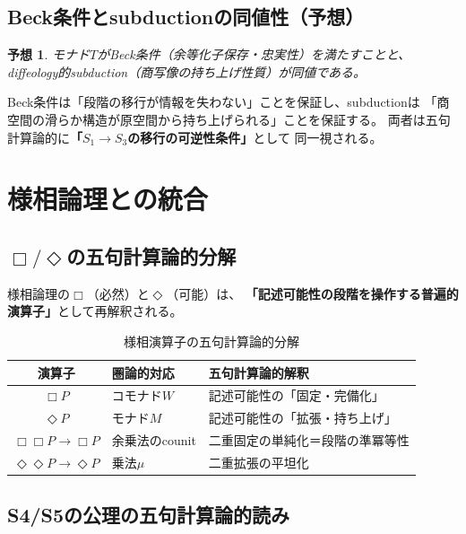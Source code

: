 \documentclass[11pt,a4paper]{ltjsarticle}
\newtheorem{conjecture}[definition]{予想}
\theoremstyle{remark}
\begin{document}
\subsection{Beck条件とsubductionの同値性（予想）}

\begin{conjecture}
モナド$T$がBeck条件（余等化子保存・忠実性）を満たすことと、
diffeology的subduction（商写像の持ち上げ性質）が同値である。
\end{conjecture}

Beck条件は「段階の移行が情報を失わない」ことを保証し、subductionは
「商空間の滑らか構造が原空間から持ち上げられる」ことを保証する。
両者は五句計算論的に\textbf{「$S_1\to S_3$の移行の可逆性条件」}として
同一視される。

\section{様相論理との統合}

\subsection{\texorpdfstring{$\Box/\Diamond$}{必然・可能演算子}の五句計算論的分解}

様相論理の$\Box$（必然）と$\Diamond$（可能）は、
\textbf{「記述可能性の段階を操作する普遍的演算子」}として再解釈される。

\begin{table}[htbp]
\centering
\caption{様相演算子の五句計算論的分解}
\label{tab:modal-op}
\small
\begin{tabularx}{\textwidth}{@{}c >{\raggedright\arraybackslash}X >{\raggedright\arraybackslash}X@{}}
\toprule
演算子 & 圏論的対応 & 五句計算論的解釈 \\
\midrule
$\Box P$ & コモナド$W$ & 記述可能性の「固定・完備化」 \\
$\Diamond P$ & モナド$M$ & 記述可能性の「拡張・持ち上げ」 \\
$\Box\Box P\to\Box P$ & 余乗法のcounit & 二重固定の単純化＝段階の準冪等性 \\
$\Diamond\Diamond P\to\Diamond P$ & 乗法$\mu$ & 二重拡張の平坦化 \\
\bottomrule
\end{tabularx}
\end{table}

\subsection{S4/S5の公理の五句計算論的読み}
\end{document}
